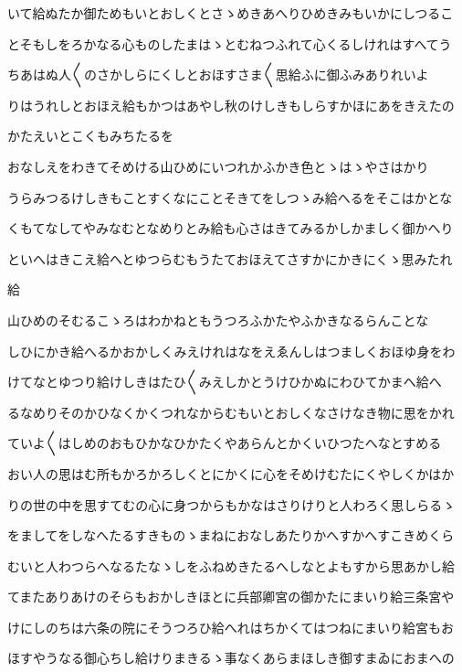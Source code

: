\documentclass[a4paper,11pt,landscape]{ltjtarticle}
\begin{document}
\par\medskip
いて給ぬたか御ためもいとおしくとさゝめきあへりひめきみもいかにしつるこ
\par\medskip
とそもしをろかなる心ものしたまはゝとむねつふれて心くるしけれはすへてう
\par\medskip
ちあはぬ人〱のさかしらにくしとおほすさま〱思給ふに御ふみありれいよ
\par\medskip
りはうれしとおほえ給もかつはあやし秋のけしきもしらすかほにあをきえたの
\par\medskip
かたえいとこくもみちたるを
\par\medskip
おなしえをわきてそめける山ひめにいつれかふかき色とゝはゝやさはかり
\par\medskip
うらみつるけしきもことすくなにことそきてをしつゝみ給へるをそこはかとな
\par\medskip
くもてなしてやみなむとなめりとみ給も心さはきてみるかしかましく御かへり
\par\medskip
といへはきこえ給へとゆつらむもうたておほえてさすかにかきにくゝ思みたれ
\par\medskip
給
\par\medskip
山ひめのそむるこゝろはわかねともうつろふかたやふかきなるらんことな
\par\medskip
しひにかき給へるかおかしくみえけれはなをえゑんしはつましくおほゆ身をわ
\par\medskip
けてなとゆつり給けしきはたひ〱みえしかとうけひかぬにわひてかまへ給へ
\par\medskip
るなめりそのかひなくかくつれなからむもいとおしくなさけなき物に思をかれ
\par\medskip
ていよ〱はしめのおもひかなひかたくやあらんとかくいひつたへなとすめる
\par\medskip
おい人の思はむ所もかろかろしくとにかくに心をそめけむたにくやしくかはか
\par\medskip
りの世の中を思すてむの心に身つからもかなはさりけりと人わろく思しらるゝ
\par\medskip
をましてをしなへたるすきものゝまねにおなしあたりかへすかへすこきめくら
\par\medskip
むいと人わつらへなるたなゝしをふねめきたるへしなとよもすから思あかし給
\par\medskip
てまたありあけのそらもおかしきほとに兵部卿宮の御かたにまいり給三条宮や
\par\medskip
けにしのちは六条の院にそうつろひ給へれはちかくてはつねにまいり給宮もお
\par\medskip
ほすやうなる御心ちし給けりまきるゝ事なくあらまほしき御すまゐにおまへの
\end{document}

